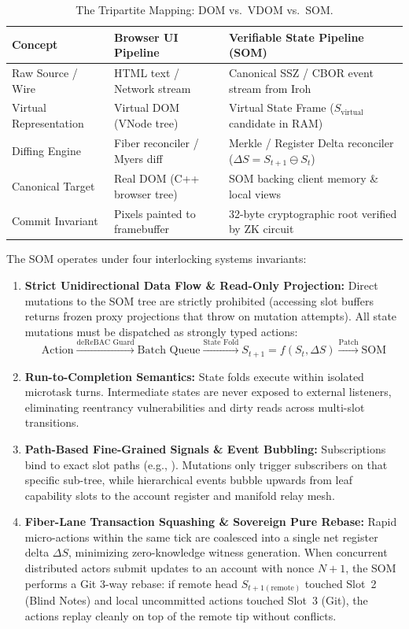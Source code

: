 \documentclass[a4paper,11pt,twoside,parskip=half-,headings=small]{scrartcl}
\begin{document}
\begin{table}[H]
\centering\small
\begin{tabularx}{\textwidth}{@{}L{3.2cm}L{4.2cm}Y@{}}
\toprule
\textbf{Concept} & \textbf{Browser UI Pipeline} & \textbf{Verifiable State Pipeline (SOM)} \\
\midrule
Raw Source / Wire & HTML text / Network stream & Canonical SSZ / CBOR event stream from Iroh \\
Virtual Representation & Virtual DOM (VNode tree) & Virtual State Frame ($S_{\text{virtual}}$ candidate in RAM) \\
Diffing Engine & Fiber reconciler / Myers diff & Merkle / Register Delta reconciler ($\Delta S = S_{t+1} \ominus S_t$) \\
Canonical Target & Real DOM (C++ browser tree) & SOM backing client memory \& local views \\
Commit Invariant & Pixels painted to framebuffer & 32-byte cryptographic root verified by ZK circuit \\
\bottomrule
\end{tabularx}
\caption{The Tripartite Mapping: DOM vs.\ VDOM vs.\ SOM.}
\end{table}

The SOM operates under four interlocking systems invariants:
\begin{enumerate}
  \item \textbf{Strict Unidirectional Data Flow \& Read-Only Projection:} Direct mutations to the SOM tree are strictly prohibited (accessing slot buffers returns frozen proxy projections that throw on mutation attempts). All state mutations must be dispatched as strongly typed actions:
  \begin{equation}
    \text{Action} \xrightarrow{\text{deReBAC Guard}} \text{Batch Queue} \xrightarrow{\text{State Fold}} S_{t+1} = f(S_t, \Delta S) \xrightarrow{\text{Patch}} \text{SOM}
  \end{equation}
  \item \textbf{Run-to-Completion Semantics:} State folds execute within isolated microtask turns. Intermediate states are never exposed to external listeners, eliminating reentrancy vulnerabilities and dirty reads across multi-slot transitions.
  \item \textbf{Path-Based Fine-Grained Signals \& Event Bubbling:} Subscriptions bind to exact slot paths (e.g., ). Mutations only trigger subscribers on that specific sub-tree, while hierarchical events bubble upwards from leaf capability slots to the account register and manifold relay mesh.
  \item \textbf{Fiber-Lane Transaction Squashing \& Sovereign Pure Rebase:} Rapid micro-actions within the same tick are coalesced into a single net register delta $\Delta S$, minimizing zero-knowledge witness generation. When concurrent distributed actors submit updates to an account with nonce $N+1$, the SOM performs a Git 3-way rebase: if remote head $S_{t+1(\text{remote})}$ touched Slot~2 (Blind Notes) and local uncommitted actions touched Slot~3 (Git), the actions replay cleanly on top of the remote tip without conflicts.
\end{enumerate}
\end{document}
